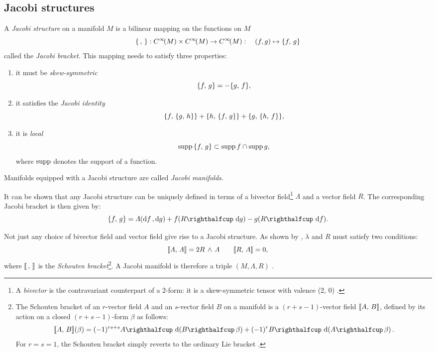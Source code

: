 \subsection{Jacobi structures}
A \emph{Jacobi structure} on a manifold $M$ is a bilinear mapping on the functions on $M$ \cite{marle1991}
$$ \{\,,\,\}: C^\infty\!\qty(M)\times C^\infty\!\qty(M) \to C^\infty\!\qty(M): \quad (f, g) \mapsto \{f,\,g\} $$
called the \emph{Jacobi bracket}. This mapping needs to satisfy three properties:
\begin{enumerate}[label=(\roman*), noitemsep]
    \item it must be \emph{skew-symmetric}
        $$ \{f,\,g\} = -\{g,\,f\}, $$
    \item it satisfies the \emph{Jacobi identity}
        $$ \{f,\,\{g,\,h\}\} + \{h,\,\{f,\,g\}\} + \{g,\,\{h,\,f\}\}, $$
    \item it is \emph{local}
        $$ \operatorname{supp}{\{f,\,g\}} \subset \operatorname{supp}{f} \cap \operatorname{supp}{g}, $$
        where $\operatorname{supp}$ denotes the support of a function.
\end{enumerate}
Manifolds equipped with a Jacobi structure are called \emph{Jacobi manifolds}.

It can be shown that any Jacobi structure can be uniquely defined in terms of a bivector field\footnote{A \emph{bivector} is the contravariant counterpart of a 2-form: it is a skew-symmetric tensor with valence (2, 0) \cite{einstein1944}.} $\Lambda$ and a vector field $R$. The corresponding Jacobi bracket is then given by: \cite{Libermann1987,marle1991}
$$ \jacobi{f}{g} = \Lambda(\dd{f}, \dd{g}) + f (\intpr{R}{\dd{g}}) - g (\intpr{R}{\dd{f}}). $$

Not just any choice of bivector field and vector field give rise to a Jacobi structure. As shown by \citet{lichnerowicz1977}, $\lambda$ and $R$ must satisfy two conditions:
$$ \llbracket\Lambda,\,\Lambda\rrbracket = 2  R\,\wedge\,\Lambda  \qquad \llbracket R,\,\Lambda\rrbracket = 0, $$
where $\llbracket\,,\,\rrbracket$ is the \emph{Schouten bracket}\footnote
{
    The Schouten bracket of an $r$-vector field $A$ and an $s$-vector field $B$ on a manifold is a $(r + s - 1)$-vector field $\llbracket A,\,B\rrbracket$, defined by its action on a closed $(r + s -1)$-form $\beta$ as follows:
    $$ \schouten{A}{B}(\beta) = (-1)^{rs + s}\intpr{A}{\dd{(\intpr{B}{\beta})}} + (-1)^r \intpr{B}{\dd{(\intpr{A}{\beta})}}. $$
    For $r = s = 1$, the Schouten bracket simply reverts to the ordinary Lie bracket \cite{dazord1991}.

}. A Jacobi manifold is therefore a triple $(M, \Lambda, R)$ \cite{Libermann1987}.

